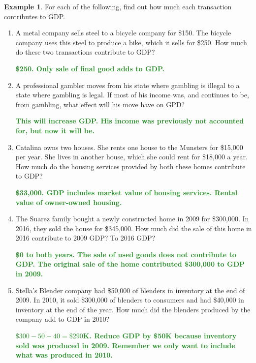 \documentclass[11pt]{article}\usepackage[]{graphicx}\usepackage[]{color}
\theoremstyle{definition}
\newtheorem{exmp}{Example}[section]
\newcommand{\ddp}[1]{{\textbf{\textcolor{ForestGreen}{#1}}}}
\begin{document}
\begin{exmp} 
	For each of the following, find out how much each transaction contributes to GDP.
	\begin{enumerate}
	\setlength{\itemsep}{1em}
\item	A metal company sells steel to a bicycle company for \$150. The bicycle company uses this steel to produce a bike, which it sells for \$250. How much do these two transactions contribute to GDP?

\ddp{\$250. Only sale of final good adds to GDP.}


\item A professional gambler moves from his state where gambling is illegal to a state where gambling is legal. If most of his income was, and continues to be, from gambling, what effect will his move have on GPD?
 
\ddp{This will increase GDP. His income was previously not accounted for, but now it will be.}


\item Catalina owns two houses. She rents one house to the Munsters for \$15,000 per year. She lives in another house, which she could rent for \$18,000 a year. How much do the housing services provided by both these homes contribute to GDP?

\ddp{\$33,000. GDP includes market value of housing services. Rental value of owner-owned housing.}


\item The Suarez family bought a newly constructed home in 2009 for \$300,000. In 2016, they sold the house for \$345,000. How much did the sale of this home in 2016 contribute to 2009 GDP? To 2016 GDP?

\ddp{\$0 to both years. The sale of used goods does not contribute to GDP. The original sale of the home contributed \$300,000 to GDP in 2009.}


\item Stella's Blender company had \$50,000 of blenders in inventory at the end of 2009. In 2010, it sold \$300,000 of blenders to consumers and had \$40,000 in inventory at the end of the year. How much did the blenders produced by the company add to GDP in 2010?

\ddp{$\$300 - 50 - 40 = \$290$K. Reduce GDP by \$50K because inventory sold was produced in 2009. Remember we only want to include what was produced in 2010.}
\end{enumerate}
\end{exmp}
\vspace{.5em}
\end{document}
